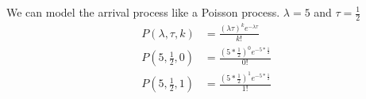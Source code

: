 \documentclass[../../probability-notes.tex]{subfile}
\begin{document}
        We can model the arrival process like a Poisson process. $\lambda = 5$ and $\tau = \frac{1}{2}$
        \begin{align*}
                P(\lambda, \tau, k) &= \frac{(\lambda \tau)^{k} e^{-\lambda \tau}}{k!} \\
                P(5, \frac{1}{2}, 0) &= \frac{(5 * \frac{1}{2})^{0} e^{-5 * \frac{1}{2}}}{0!} \\
                P(5, \frac{1}{2}, 1) &= \frac{(5 * \frac{1}{2})^{1} e^{-5 * \frac{1}{2}}}{1!}
        \end{align*}
\end{document}
